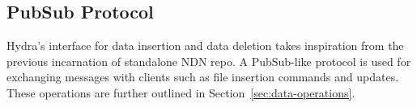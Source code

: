 \subsection{PubSub Protocol} \label{sec:pubsub}

Hydra's interface for data insertion and data deletion takes inspiration from the previous incarnation of standalone NDN repo\cite{}. A PubSub-like protocol is used for exchanging messages with clients such as file insertion commands and updates. These operations are further outlined in Section~\ref{sec:data-operations}.